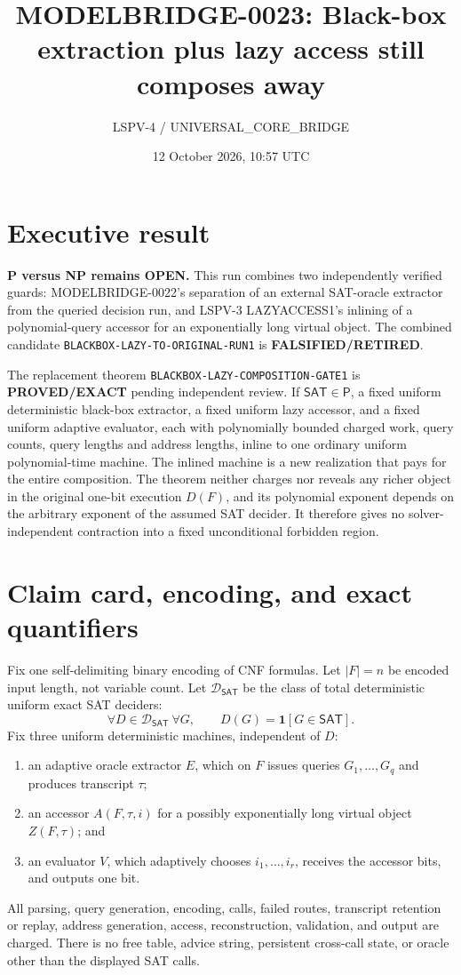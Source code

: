 \documentclass[11pt]{article}
\title{MODELBRIDGE-0023: Black-box extraction plus lazy access still composes away}
\author{LSPV-4 / UNIVERSAL\_CORE\_BRIDGE}
\date{12 October 2026, 10:57 UTC}
\newcommand{\SAT}{\mathsf{SAT}}
\newcommand{\Pclass}{\mathsf{P}}
\newcommand{\EXACT}{\textbf{PROVED/EXACT}}
\newcommand{\RETIRED}{\textbf{FALSIFIED/RETIRED}}
\begin{document}
\maketitle

\section*{Executive result}
\textbf{P versus NP remains OPEN.}  This run combines two independently
verified guards: MODELBRIDGE-0022's separation of an external SAT-oracle
extractor from the queried decision run, and LSPV-3 LAZYACCESS1's inlining of
a polynomial-query accessor for an exponentially long virtual object.  The
combined candidate
\texttt{BLACKBOX-LAZY-TO-ORIGINAL-RUN1} is \RETIRED.

The replacement theorem
\texttt{BLACKBOX-LAZY-COMPOSITION-GATE1} is \EXACT{} pending independent
review.  If \(\SAT\in\Pclass\), a fixed uniform deterministic black-box
extractor, a fixed uniform lazy accessor, and a fixed uniform adaptive
evaluator, each with polynomially bounded charged work, query counts, query
lengths and address lengths, inline to one ordinary uniform polynomial-time
machine.  The inlined machine is a new realization that pays for the entire
composition.  The theorem neither charges nor reveals any richer object in
the original one-bit execution \(D(F)\), and its polynomial exponent depends
on the arbitrary exponent of the assumed SAT decider.  It therefore gives no
solver-independent contraction into a fixed unconditional forbidden region.

\section{Claim card, encoding, and exact quantifiers}
Fix one self-delimiting binary encoding of CNF formulas.  Let \(|F|=n\) be
encoded input length, not variable count.  Let \(\mathcal D_{\SAT}\) be the
class of total deterministic uniform exact SAT deciders:
\[
 \forall D\in\mathcal D_{\SAT}\ \forall G,\qquad
 D(G)=\mathbf 1[G\in\SAT].
\]
Fix three uniform deterministic machines, independent of \(D\):
\begin{enumerate}[leftmargin=*]
\item an adaptive oracle extractor \(E\), which on \(F\) issues queries
\(G_1,\ldots,G_q\) and produces transcript \(\tau\);
\item an accessor \(A(F,\tau,i)\) for a possibly exponentially long virtual
object \(Z(F,\tau)\); and
\item an evaluator \(V\), which adaptively chooses
\(i_1,\ldots,i_r\), receives the accessor bits, and outputs one bit.
\end{enumerate}
All parsing, query generation, encoding, calls, failed routes, transcript
retention or replay, address generation, access, reconstruction, validation,
and output are charged.  There is no free table, advice string, persistent
cross-call state, or oracle other than the displayed SAT calls.
\end{document}
